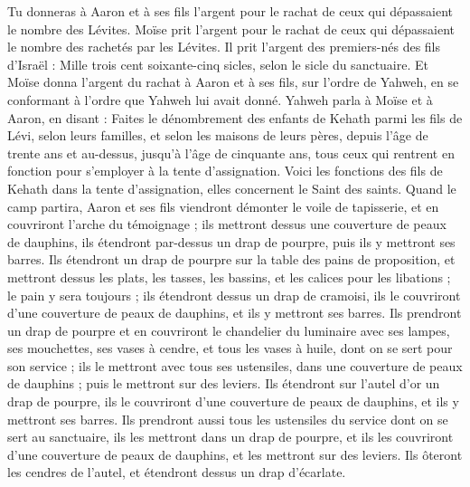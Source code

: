 \begin{multicols}{2}
Tu donneras à Aaron et à ses fils l'argent pour le rachat de ceux qui dépassaient le nombre des Lévites.
Moïse prit l'argent pour le rachat de ceux qui dépassaient le nombre des rachetés par les Lévites.
Il prit l'argent des premiers-nés des fils d'Israël : Mille trois cent soixante-cinq sicles, selon le sicle du sanctuaire.
Et Moïse donna l'argent du rachat à Aaron et à ses fils, sur l’ordre de Yahweh, en se conformant à l’ordre que Yahweh lui avait donné.
\VerseOne{}Yahweh parla à Moïse et à Aaron, en disant :
Faites le dénombrement des enfants de Kehath parmi les fils de Lévi, selon leurs familles, et selon les maisons de leurs pères,
depuis l'âge de trente ans et au-dessus, jusqu'à l'âge de cinquante ans, tous ceux qui rentrent en fonction pour s'employer à la tente d'assignation.
Voici les fonctions des fils de Kehath dans la tente d'assignation, elles concernent le Saint des saints.
Quand le camp partira, Aaron et ses fils viendront démonter le voile de tapisserie, et en couvriront l'arche du témoignage ;
ils mettront dessus une couverture de peaux de dauphins, ils étendront par-dessus un drap de pourpre, puis ils y mettront ses barres.
Ils étendront un drap de pourpre sur la table des pains de proposition, et mettront dessus les plats, les tasses, les bassins, et les calices pour les libations ; le pain y sera toujours ;
ils étendront dessus un drap de cramoisi, ils le couvriront d'une couverture de peaux de dauphins, et ils y mettront ses barres.
Ils prendront un drap de pourpre et en couvriront le chandelier du luminaire avec ses lampes, ses mouchettes, ses vases à cendre, et tous les vases à huile, dont on se sert pour son service ;
ils le mettront avec tous ses ustensiles, dans une couverture de peaux de dauphins ; puis le mettront sur des leviers.
Ils étendront sur l'autel d'or un drap de pourpre, ils le couvriront d'une couverture de peaux de dauphins, et ils y mettront ses barres.
Ils prendront aussi tous les ustensiles du service dont on se sert au sanctuaire, ils les mettront dans un drap de pourpre, et ils les couvriront d'une couverture de peaux de dauphins, et les mettront sur des leviers.
Ils ôteront les cendres de l'autel, et étendront dessus un drap d'écarlate.

\end{multicols}
